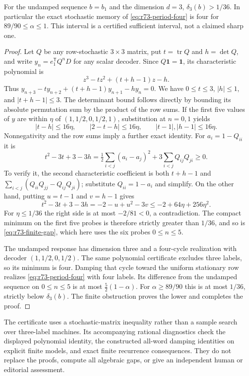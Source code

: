 \begin{proposition}\label{prop:r73-period-four}
For the undamped sequence $b=b_1$ and the dimension $d=3$,
$\delta_3(b)>1/36$. In particular the exact stochastic memory of
\eqref{eq:r73-period-four} is four for $89/90\le\alpha\le1$.
This interval is a certified sufficient interval, not a claimed sharp one.
\end{proposition}
\begin{proof}
Let $Q$ be any row-stochastic $3\times3$ matrix, put $t=\operatorname{tr}Q$
and $h=\det Q$, and write $y_n=e_1^{\mathsf T}Q^nD$ for any scalar decoder.
Since $Q\mathbf1=\mathbf1$, its characteristic polynomial is
\[
 z^3-tz^2+(t+h-1)z-h.
\]
Thus $y_{n+3}-ty_{n+2}+(t+h-1)y_{n+1}-hy_n=0$. We have $0\le t\le3$,
$|h|\le1$, and $|t+h-1|\le3$. The determinant bound follows directly by
bounding its absolute permutation sum by the product of the row sums.
If the first five values of $y$ are within $\eta$ of
$(1,1/2,0,1/2,1)$, substitution at $n=0,1$ yields
\[
 |t-h|\le16\eta,\qquad |2-t-h|\le16\eta,
 \qquad |t-1|,|h-1|\le16\eta.
\]
Nonnegativity and the row sums imply a further exact identity. For
$a_i=1-Q_{ii}$ it is
\begin{equation}\label{eq:r73-three-state-certificate}
 t^2-3t+3-3h
 =\tfrac12\sum_{i<j}(a_i-a_j)^2
       +3\sum_{i<j}Q_{ij}Q_{ji}\ge0.
\end{equation}
To verify it, the second characteristic coefficient is both $t+h-1$ and
$\sum_{i<j}(Q_{ii}Q_{jj}-Q_{ij}Q_{ji})$; substitute
$Q_{ii}=1-a_i$ and simplify. On the other hand, putting $u=t-1$ and $v=h-1$
gives
\[
 t^2-3t+3-3h=-2-u+u^2-3v
       \le-2+64\eta+256\eta^2.
\]
For $\eta\le1/36$ the right side is at most $-2/81<0$, a contradiction.
The compact minimum on the first five probes is therefore strictly greater
than $1/36$, and so is \eqref{eq:r73-finite-gap}, which here uses the six
probes $0\le n\le5$.

The undamped response has dimension three and a four-cycle realization with
decoder $(1,1/2,0,1/2)$. The same polynomial certificate excludes three labels,
so its minimum is four. Damping that cycle toward the uniform stationary row
realizes \eqref{eq:r73-period-four} with four labels. Its difference from the
undamped sequence on $0\le n\le5$ is at most
$\tfrac52(1-\alpha)$. For $\alpha\ge89/90$ this is at most $1/36$, strictly
below $\delta_3(b)$. The finite obstruction proves the lower and completes
the proof.
\end{proof}

The certificate uses a stochastic-matrix inequality rather than a sample
search over three-label machines. Its accompanying rational diagnostics check
the displayed polynomial identity, the constructed all-word damping
identities on explicit finite models, and exact finite recurrence consequences.
They do not replace the proofs, compute all algebraic gaps, or give an
independent human or editorial assessment.
